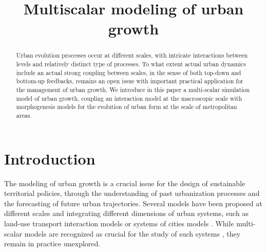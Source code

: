 \documentclass[11pt]{article}
\title{Multiscalar modeling of urban growth}
\date{}
\begin{document}
\maketitle


\begin{abstract}
	Urban evolution processes occur at different scales, with intricate interactions between levels and relatively distinct type of processes. To what extent actual urban dynamics include an actual strong coupling between scales, in the sense of both top-down and bottom-up feedbacks, remains an open issue with important practical application for the management of urban growth. We introduce in this paper a multi-scalar simulation model of urban growth, coupling an interaction model at the macroscopic scale with morphogenesis models for the evolution of urban form at the scale of metropolitan areas.
\end{abstract}




\cite{hjorth2020levelspace}

\cite{shu2020modelling}


\cite{louail2010comparer}


\cite{wegener2018multi}



\section{Introduction}

The modeling of urban growth is a crucial issue for the design of sustainable territorial policies, through the understanding of past urbanization processes and the forecasting of future urban trajectories. Several models have been proposed at different scales and integrating different dimensions of urban systems, such as land-use transport interaction models \cite{wegener2004land} or systems of cities models \cite{pumain2017urban}. While multi-scalar models are recognized as crucial for the study of such systems \cite{Rozenblat2018}, they remain in practice unexplored.
\end{document}

